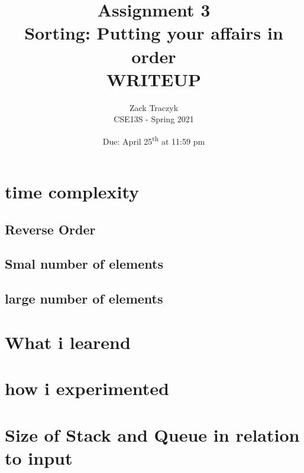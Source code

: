 \documentclass[12pt]{article}
\title{%
	\textbf{Assignment 3 \\ 
	Sorting: Putting your affairs in order \\
	\large WRITEUP} }
\author{Zack Traczyk \\ CSE13S - Spring 2021}
\date{Due: April 25\textsuperscript{th} at 11:59 pm}
\begin{document}
	\maketitle

	\section{time complexity}

	\subsection{Reverse Order}

	\subsection{Smal number of elements}

	\subsection{large number of elements}

	\section{What i learend}

	\section{how i experimented}

	\section{Size of Stack and Queue in relation to input}

	
\end{document}
